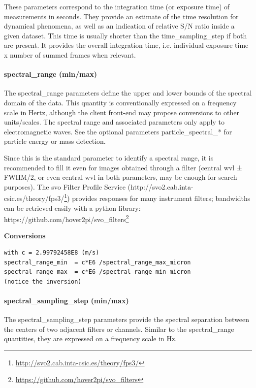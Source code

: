 \documentclass[11pt,a4paper]{ivoa}
\begin{document}
These parameters correspond to the integration time (or exposure time) of measurements in seconds. They provide an estimate of the time resolution for dynamical phenomena, as well as an indication of relative S/N ratio inside a given dataset. This time is usually shorter than the time\_sampling\_step if both are present. It provides the overall integration time, i.e. individual exposure time x number of summed frames when relevant. 

\paragraph{spectral\_range (min/max)}

The spectral\_range parameters define the upper and lower bounds of the spectral domain of the data. This quantity is conventionally expressed on a frequency scale in Hertz, although the client front-end may propose conversions to other units/scales. The spectral range and associated parameters only apply to electromagnetic waves. See the optional parameters particle\_spectral\_* for particle energy or mass detection.

Since this is the standard parameter to identify a spectral range, it is recommended to fill it even for images obtained through a filter (central wvl ± FWHM/2, or even central wvl in both parameters, may be enough for search purposes). The svo Filter Profile Service (http://svo2.cab.inta-csic.es/theory/fps3/\footnote{\url{http://svo2.cab.inta-csic.es/theory/fps3/}}) provides responses for many instrument filters; bandwidths can be retrieved easily with a python library: https://github.com/hover2pi/svo\_filters\footnote{\url{https://github.com/hover2pi/svo_filters}}


\textbf{Conversions}

\begin{verbatim}
with c = 2.99792458E8 (m/s)
spectral_range_min  = c*E6 /spectral_range_max_micron
spectral_range_max  = c*E6 /spectral_range_min_micron
(notice the inversion)
\end{verbatim}

\paragraph{spectral\_sampling\_step (min/max)}

The spectral\_sampling\_step parameters provide the spectral separation between the centers of two adjacent filters or channels. Similar to the spectral\_range quantities, they are expressed on a frequency scale in Hz. 
\end{document}
